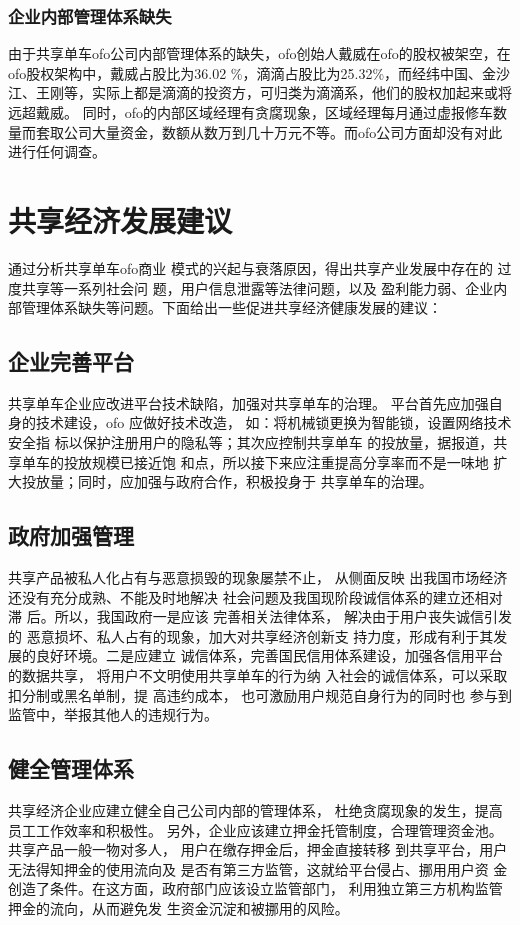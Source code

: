 \documentclass[a4paper,oneside,12pt]{article}
\begin{document}
\subsubsection{企业内部管理体系缺失}
由于共享单车ofo公司内部管理体系的缺失，ofo创始人戴威在ofo的股权被架空，在ofo股权架构中，戴威占股比为36.02
\%，滴滴占股比为25.32\%，而经纬中国、金沙江、王刚等，实际上都是滴滴的投资方，可归类为滴滴系，他们的股权加起来或将远超戴威。
同时，ofo的内部区域经理有贪腐现象，区域经理每月通过虚报修车数量而套取公司大量资金，数额从数万到几十万元不等。而ofo公司方面却没有对此进行任何调查。

\section{共享经济发展建议}

通过分析共享单车ofo商业
模式的兴起与衰落原因，得出共享产业发展中存在的
过度共享等一系列社会问
题，用户信息泄露等法律问题，以及
盈利能力弱、企业内部管理体系缺失等问题。下面给出一些促进共享经济健康发展的建议：

\subsection{企业完善平台}
共享单车企业应改进平台技术缺陷，加强对共享单车的治理。
平台首先应加强自身的技术建设，ofo 应做好技术改造，
如：将机械锁更换为智能锁，设置网络技术安全指
标以保护注册用户的隐私等；其次应控制共享单车
的投放量，据报道，共享单车的投放规模已接近饱
和点，所以接下来应注重提高分享率而不是一味地
扩大投放量；同时，应加强与政府合作，积极投身于
共享单车的治理。
\subsection{政府加强管理}
共享产品被私人化占有与恶意损毁的现象屡禁不止， 从侧面反映
出我国市场经济还没有充分成熟、不能及时地解决
社会问题及我国现阶段诚信体系的建立还相对滞
后。所以，我国政府一是应该
完善相关法律体系， 解决由于用户丧失诚信引发的
恶意损坏、私人占有的现象，加大对共享经济创新支
持力度，形成有利于其发展的良好环境。二是应建立
诚信体系，完善国民信用体系建设，加强各信用平台
的数据共享， 将用户不文明使用共享单车的行为纳
入社会的诚信体系，可以采取扣分制或黑名单制，提
高违约成本， 也可激励用户规范自身行为的同时也
参与到监管中，举报其他人的违规行为。
\subsection{健全管理体系}
共享经济企业应建立健全自己公司内部的管理体系，
杜绝贪腐现象的发生，提高员工工作效率和积极性。
另外，企业应该建立押金托管制度，合理管理资金池。共享产品一般一物对多人，
用户在缴存押金后，押金直接转移
到共享平台，用户无法得知押金的使用流向及
是否有第三方监管，这就给平台侵占、挪用用户资
金创造了条件。在这方面，政府部门应该设立监管部门，
利用独立第三方机构监管押金的流向，从而避免发
生资金沉淀和被挪用的风险。
\end{document}
